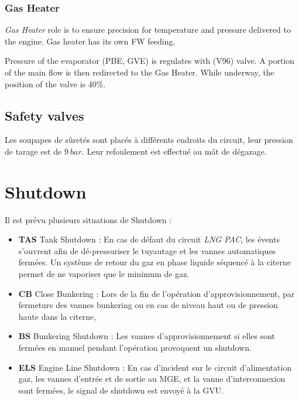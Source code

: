 \documentclass[12pt,a4paper]{article}
\begin{document}
\subsubsection{Gas Heater}

\emph{Gas Heater} role is to ensure precision for temperature and pressure delivered to the engine. Gas heater has its own FW feeding.

Pressure of the evaporator (PBE, GVE) is regulates with (V96) valve. A portion of the main flow is then redirected to the Gas Heater. While underway, the position of the valve is 40\%.\\



\subsection{Safety valves}

Les soupapes de sûretés sont placés à différents endroits du circuit, leur pression de tarage est de $9~bar$. Leur refoulement est effectué au mât de dégazage.

\section{Shutdown}

Il est prévu plusieurs situations de Shutdown :
\begin{itemize}
 \item \textbf{TAS} Tank Shutdown : En cas de défaut du circuit \emph{LNG PAC}, les évents s'ouvrent afin de dé-pressuriser le tuyautage et les vannes automatiques fermées. Un système de retour du gaz en phase liquide séquencé à la citerne permet de ne vaporiser que le minimum de gaz.  
 \item \textbf{CB} Close Bunkering : Lors de la fin de l'opération d'approvisionnement, par fermeture des vannes bunkering ou en cas de niveau haut ou de pression haute dans la citerne, 
 \item \textbf{BS} Bunkering Shutdown : Les vannes d'approvisionnement si elles sont fermées en manuel pendant l'opération provoquent un shutdown.
 \item \textbf{ELS} Engine Line Shutdown : En cas d'incident sur le circuit d'alimentation gaz, les vannes d'entrée et de sortie au MGE, et la vanne d'interconnexion sont fermées, le signal de shutdown est envoyé à la GVU.
 
\end{itemize}
\end{document}
